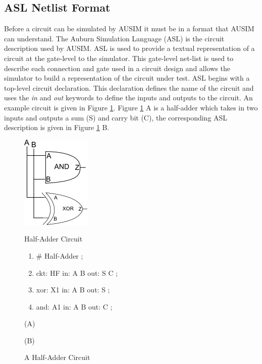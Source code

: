 \documentclass[12pt]{report}
\begin{document}
\subsection{ASL Netlist Format}
Before a circuit can be simulated by AUSIM it must be in a format that AUSIM can understand.  The Auburn Simulation Language (ASL) is the circuit description used by AUSIM\cite{asl}.  ASL is used to provide a textual representation of a circuit at the gate-level to the simulator.  This gate-level net-list is used to describe each connection and gate used in a circuit design and allows the simulator to build a representation of the circuit under test.  ASL begins with a top-level circuit declaration.  This declaration defines the name of the circuit and uses the \textit{in} and \textit{out} keywords to define the inputs and outputs to the circuit\cite{asl}.  An example circuit is given in Figure \ref{fig:half_adder}.  Figure \ref{fig:half_adder} A is a half-adder which takes in two inputs and outputs a sum (S) and carry bit (C), the corresponding ASL description is given in Figure \ref{fig:half_adder} B.
\begin{figure}
	\begin{center}
		\begin{minipage}[l]{.45\textwidth}
			\includegraphics[scale=1]{images/half-adder}	
		\end{minipage}
		\begin{minipage}[r]{.45\textwidth}
			\begin{center}
				Half-Adder Circuit
			\end{center}
			\begin{enumerate}
				\setlength{\itemsep}{0cm}
				\item \# Half-Adder ;
				\item ckt: HF in: A B out: S C ;
				\item xor: X1 in: A B out: S ;
				\item and: A1 in: A B out: C ;
			\end{enumerate}
		\end{minipage}
	\end{center}
	\begin{center}
		\begin{minipage}[l]{.45\textwidth}
			(A)
		\end{minipage}
		\begin{minipage}[r]{.45\textwidth}
			(B)
		\end{minipage}
	\end{center}
	\caption{A Half-Adder Circuit}
	\label{fig:half_adder}
\end{figure}
\end{document}
